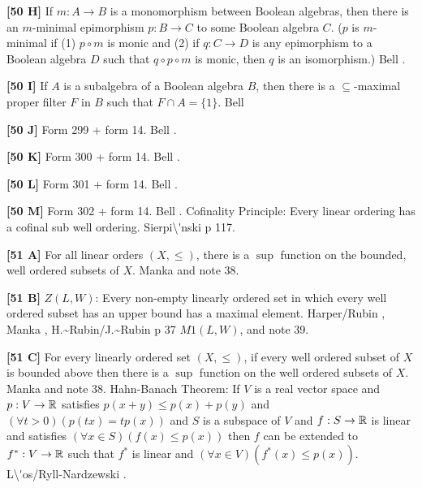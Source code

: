 \smallskip
\item{}{\bf [50 H]} If $m: A\to B$ is a monomorphism between Boolean
algebras, then there is an $m$-minimal epimorphism $p: B\to C$ to some
Boolean algebra $C$.  ($p$ is $m$-minimal if (1) $p\circ m$ is monic and
(2) if $q:C\to D$ is any epimorphism to a Boolean algebra $D$ such that
$q\circ p\circ m$ is monic, then $q$ is an isomorphism.)  \ac{Bell}
\cite{1988}.
\smallskip
\item{}{\bf [50 I]}  If $A$ is a subalgebra of a Boolean algebra $B$, then
there is a $\subseteq$-maximal proper filter $F$ in $B$ such that $F\cap A=
\{ 1\}$.  \ac{Bell} \cite{1988}
\smallskip
\item{}{\bf [50 J]} Form 299 + form 14.  \ac{Bell} \cite{1988}.
\smallskip
\item{}{\bf [50 K]} Form 300 + form 14.  \ac{Bell} \cite{1988}.
\smallskip
\item{}{\bf [50 L]} Form 301 + form 14.  \ac{Bell} \cite{1988}.
\smallskip
\item{}{\bf [50 M]} Form 302 + form 14.  \ac{Bell} \cite{1988}.
\medskip
{} Cofinality Principle: Every linear ordering has a
cofinal sub well ordering.  \ac{Sierpi\'nski} \cite{1918} p 117.
\smallskip
\item{}{\bf [51 A]}  For all linear orders $(X,\le )$, there is a $\sup$
function on the bounded, well ordered subsets of $X$.  \ac{Manka}
\cite{1988a} and note 38.
\smallskip
\item{}{\bf [51 B]}  $Z(L,W)$:  Every non-empty linearly ordered set in
which every well ordered subset has  an  upper  bound  has  a  maximal
element.  \ac{Harper/Rubin} \cite{1976},  \ac{Manka} \cite{1988a},
\ac{H.~Rubin/J.~Rubin}
\cite{1985} p 37 $M1(L,W)$, and note 39.
\smallskip
\item{}{\bf [51 C]}  For  every  linearly  ordered  set $(X,\le )$,  if
every well ordered subset of $X$ is bounded above then there is a $\sup$
function on the well ordered subsets of $X$.  \ac{Manka}
\cite{1988a} and note 38.
\medskip
{} Hahn-Banach Theorem:  If $V$ is a real vector space
and $p: V \rightarrow {\Bbb R}$ satisfies $p(x+y) \le p(x) + p(y)$ and
$(\forall t > 0)( p(tx) = tp(x) )$ and $S$ is a subspace of $V$ and
$f:S \rightarrow {\Bbb R}$ is linear and satisfies $(\forall  x \in
S)( f(x) \le  p(x) )$ then $f$ can be extended to $f^{*} : V \rightarrow
{\Bbb R}$ such that $f^{*}$ is linear and $(\forall x \in V)(f^{*}(x)
\le p(x))$.  \ac{L\'os/Ryll-Nardzewski} \cite{1951}. 
